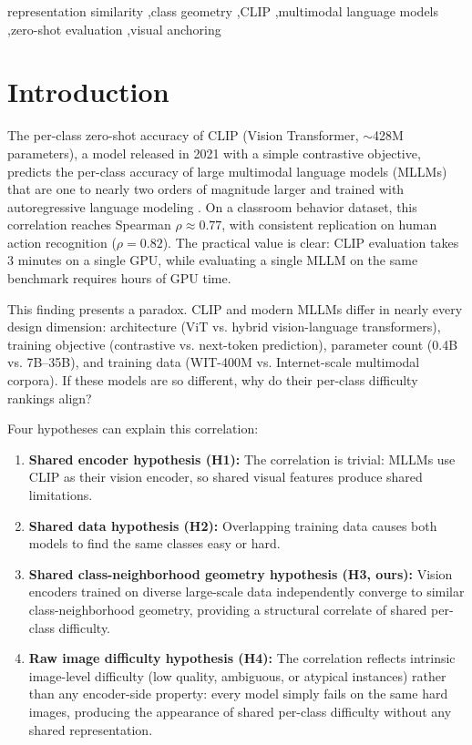 \documentclass[a4paper,fleqn]{cas-sc}
\begin{document}
\begin{keywords}
representation similarity \sep class geometry \sep CLIP \sep multimodal language models \sep zero-shot evaluation \sep visual anchoring
\end{keywords}

\maketitle

\section{Introduction}
\label{sec:intro}

The per-class zero-shot accuracy of CLIP (Vision Transformer, $\sim$428M parameters), a model released in 2021 with a simple contrastive objective, predicts the per-class accuracy of large multimodal language models (MLLMs) that are one to nearly two orders of magnitude larger and trained with autoregressive language modeling \cite{ma2025anchorscore}. On a classroom behavior dataset, this correlation reaches Spearman $\rho\approx0.77$, with consistent replication on human action recognition ($\rho=0.82$). The practical value is clear: CLIP evaluation takes 3 minutes on a single GPU, while evaluating a single MLLM on the same benchmark requires hours of GPU time.

This finding presents a paradox. CLIP and modern MLLMs differ in nearly every design dimension: architecture (ViT vs. hybrid vision-language transformers), training objective (contrastive vs. next-token prediction), parameter count (0.4B vs. 7B--35B), and training data (WIT-400M vs. Internet-scale multimodal corpora). If these models are so different, why do their per-class difficulty rankings align?

Four hypotheses can explain this correlation:

\begin{enumerate}
  \item \textbf{Shared encoder hypothesis (H1):} The correlation is trivial: MLLMs use CLIP as their vision encoder, so shared visual features produce shared limitations.
  \item \textbf{Shared data hypothesis (H2):} Overlapping training data causes both models to find the same classes easy or hard.
  \item \textbf{Shared class-neighborhood geometry hypothesis (H3, ours):} Vision encoders trained on diverse large-scale data independently converge to similar class-neighborhood geometry, providing a structural correlate of shared per-class difficulty.
  \item \textbf{Raw image difficulty hypothesis (H4):} The correlation reflects intrinsic image-level difficulty (low quality, ambiguous, or atypical instances) rather than any encoder-side property: every model simply fails on the same hard images, producing the appearance of shared per-class difficulty without any shared representation.
\end{enumerate}
\end{document}
